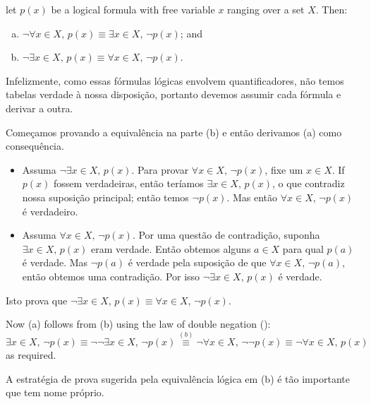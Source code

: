 \begin{theorem}
\label{thmDeMorganQuantifiers}
let $p(x)$ be a logical formula with free variable $x$ ranging over a set $X$. Then:
\begin{enumerate}[(a)]
\item $\neg \forall x \in X,\, p(x) \equiv \exists x \in X,\, \neg p(x)$; and
\item $\neg \exists x \in X,\, p(x) \equiv \forall x \in X,\, \neg p(x)$.
\end{enumerate}
\end{theorem}

\begin{cproof}
Infelizmente, como essas fórmulas lógicas envolvem quantificadores, não temos tabelas verdade à nossa disposição, portanto devemos assumir cada fórmula e derivar a outra.

Começamos provando a equivalência na parte (b) e então derivamos (a) como consequência.

\begin{itemize}
\item Assuma $\neg \exists x \in X,\, p(x)$. Para provar $\forall x \in X,\, \neg p(x)$, fixe um $x \in X$. If $p(x)$ fossem verdadeiras, então teríamos $\exists x \in X,\, p(x)$, o que contradiz nossa suposição principal; então temos $\neg p(x)$. Mas então $\forall x \in X,\, \neg p(x)$ é verdadeiro.

\item Assuma $\forall x \in X,\, \neg p(x)$. Por uma questão de contradição, suponha $\exists x \in X,\, p(x)$ eram verdade. Então obtemos alguns $a \in X$ para qual $p(a)$ é verdade. Mas $\neg p(a)$ é verdade pela suposição de que $\forall x \in X,\, \neg p(a)$, então obtemos uma contradição. Por isso $\neg \exists x \in X,\, p(x)$ é verdade.
\end{itemize}

Isto prova que $\neg \exists x \in X,\, p(x) \equiv \forall x \in X,\, \neg p(x)$.

Now (a) follows from (b) using the law of double negation ():
\[ \exists x \in X,\, \neg p(x) \equiv \neg\neg \exists x \in X,\, \neg p(x) \overset{(b)}{\equiv} \neg \forall x \in X,\, \neg \neg p(x) \equiv \neg \forall x \in X,\, p(x)\]
as required.
\end{cproof}

A estratégia de prova sugerida pela equivalência lógica em (b) é tão importante que tem nome próprio.

